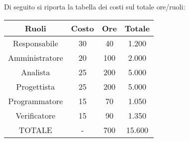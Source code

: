 \documentclass{classes/base}
\begin{document}
    Di seguito si riporta la tabella dei costi sul totale ore/ruoli:
    \begin{table}[!h]
        \begin{center}
            \setlength{\extrarowheight}{.75ex}
            \begin{tabular}{ | c | c | c | c | }
                \hline 	
                \textbf{Ruoli} & \textbf{Costo} & \textbf{Ore} & \textbf{Totale}\\
                \hline 			
                
                Responsabile{} & 30{} & 40{} & 1.200{} \\
                Amministratore{} & 20{} & 100{} & 2.000{} \\
                Analista{} & 25{} & 200{} & 5.000{} \\
                Progettista{} & 25{} & 200{} & 5.000{}  \\
                Programmatore{} & 15{} & 70{} & 1.050{}  \\
                Verificatore{} & 15{} & 90{} & 1.350{}  \\
                TOTALE{} & -{} & 700{} & 15.600{}  \\	
                
                \hline 
            \end{tabular}
        \end{center}
    \end{table}
   
\end{document}
